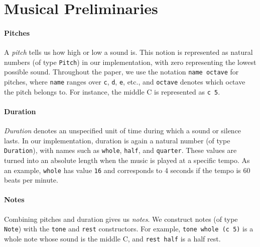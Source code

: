 \section{Musical Preliminaries}
\label{sec:music}

\paragraph{Pitches}
A \emph{pitch} tells us how high or low a sound is.
This notion is represented as natural numbers (of type
\texttt{Pitch}) in our implementation, with zero representing the
lowest possible sound.
Throughout the paper, we use the notation \texttt{name octave}
for pitches, where \texttt{name} ranges over \texttt{c}, \texttt{d},
\texttt{e}, etc., and \texttt{octave} denotes which octave the pitch
belongs to.
For instance, the middle C is represented as \texttt{c 5}.




\paragraph{Duration}
\emph{Duration} denotes an unspecified unit of time during which
a sound or silence lasts.
In our implementation, duration is again a natural number (of type
\texttt{Duration}), with names such as \texttt{whole}, \texttt{half},
and \texttt{quarter}.
These values are turned into an absolute length when the music is
played at a specific tempo.
As an example, \texttt{whole} has value \texttt{16} and corresponds
to 4 seconds if the tempo is 60 beats per minute.


\paragraph{Notes}
Combining pitches and duration gives us \emph{notes}.
We construct notes (of type \texttt{Note}) with the \texttt{tone}
and \texttt{rest} constructors.
For example, \texttt{tone whole (c 5)} is a whole note whose
sound is the middle C, and \texttt{rest half} is a half rest.

